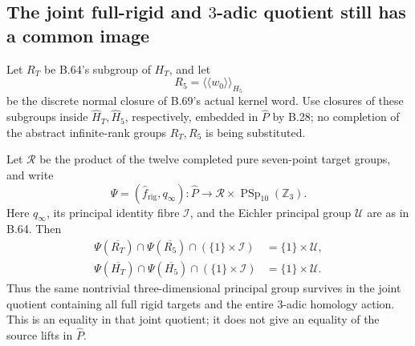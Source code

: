 \subsection*{The joint full-rigid and $3$-adic quotient still has a common image}

Let $R_T$ be B.64's subgroup of $H_T$, and let
\[
                       R_5=\langle\!\langle w_0\rangle\!\rangle_{H_5}
                                                               \tag{B.71.1}
\]
be the discrete normal closure of B.69's actual kernel word.
Use closures of these subgroups inside
$\widehat H_T,\widehat H_5$, respectively, embedded in
$\widehat P$ by B.28; no completion of the abstract
infinite-rank groups $R_T,R_5$ is being substituted.

Let $\mathscr R$ be the product of the twelve completed
pure seven-point target groups, and write
\[
 \Psi=(\widehat f_{\mathrm{rig}},q_\infty):\widehat P
          \longrightarrow\mathscr R\times
                         \operatorname{PSp}_{10}(\mathbb Z_3).
                                                               \tag{B.71.2}
\]
Here $q_\infty$, its principal identity fibre $\mathcal I$,
and the Eichler principal group $\mathcal U$ are as in B.64.
Then
\[
 \begin{split}
 \Psi(\overline{R_T})\cap\Psi(\overline{R_5})
       \cap(\{1\}\times\mathcal I)
       &=\{1\}\times\mathcal U,\\
 \Psi(\overline{H_T})\cap\Psi(\overline{H_5})
       \cap(\{1\}\times\mathcal I)
       &=\{1\}\times\mathcal U.
 \end{split}                                                    \tag{B.71.3}
\]
Thus the same nontrivial three-dimensional principal group
survives in the joint quotient containing all full rigid
targets and the entire $3$-adic homology action.
This is an equality in that joint quotient; it does not
give an equality of the source lifts in $\widehat P$.

